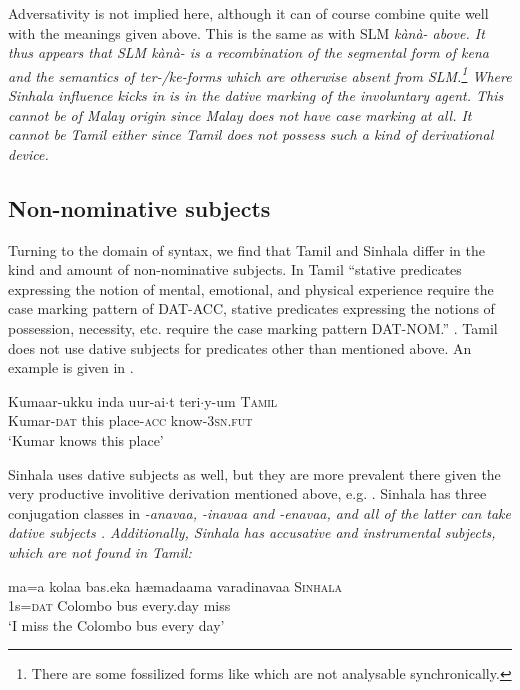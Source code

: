 \documentclass[a4paper,10pt]{article}
\newcommand{\T}{\tz}
\begin{document}
Adversativity is not implied here, although it can of course combine quite well with the meanings given above. This is the same as with SLM \em kànà- \em above. It thus appears that SLM \em kànà- \em is a recombination of the segmental form of \em kena \em and the semantics of \em ter-/ke-\em forms which are otherwise absent from SLM.\footnote{There are some fossilized forms like  which are not analysable synchronically.} Where Sinhala influence kicks in is in the dative marking of the involuntary agent. This cannot be of Malay origin since Malay does not have case marking at all. It cannot be Tamil either since Tamil does not possess such a kind of derivational device.

\subsection{Non-nominative subjects}
Turning to the domain of syntax, we find that Tamil and Sinhala differ in the kind and amount of non-nominative subjects.
In Tamil ``stative predicates expressing the notion of mental, emotional, and physical experience require the case marking pattern of DAT-ACC, \el{} stative predicates expressing the notions of possession, necessity, etc. require the case marking pattern DAT-NOM.'' \citep[180]{Lehmann1989tamil}. Tamil does not use dative subjects for predicates other than mentioned above. An example is given in .

\ea\label{ex:subj:tam:dat:exp}
\gll Kumaar-ukku inda uur-ai$\cdot$t teri$\cdot$y-um \textsc{Tamil} \\
      Kumar-\textsc{dat} this place-\textsc{acc} know-3\textsc{sn}.\textsc{fut}\\
`Kumar knows this place'\citep[184]{Lehmann1989tamil}
\z

Sinhala  uses dative subjects as well, but they are more prevalent there given the very productive involitive derivation mentioned above, e.g. .  Sinhala has three conjugation classes in \em -anavaa, -inavaa \em  and \em -enavaa\em, and all of the latter can take dative subjects \citep{Gair1971actioninvolvement}. Additionally, Sinhala has accusative  and instrumental  subjects, which are not found in Tamil:

\ea\label{ex:subj:sinh:dat:exp}
\gll ma=\T{}a kola\umb{}a bas.eka h\ae{}madaama varadinavaa   \textsc{Sinhala}\\
     1s=\textsc{dat} Colombo bus every.day miss \\
`I miss the Colombo bus every day' \citep[791]{Gair2003}
\z
\end{document}
